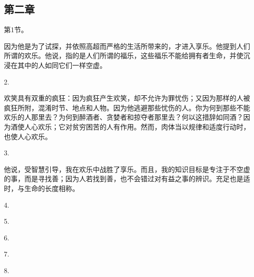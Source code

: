 
\subsection{第二章}

第1节。\par

因为他是为了试探，并依照高超而严格的生活所带来的，才进入享乐。他提到人们所谓的欢乐。他说，指的是人们所谓的福乐，这些福乐不能给拥有者生命，并使沉浸在其中的人如同它们一样空虚。\par

2. \par

欢笑具有双重的疯狂：因为疯狂产生欢笑，却不允许为罪忧伤；又因为那样的人被疯狂所附，混淆时节、地点和人物。因为他逃避那些忧伤的人。你为何到那些不能欢乐的人那里去？为何到醉酒者、贪婪者和掠夺者那里去？何以这措辞如同酒？因为酒使人心欢乐；它对贫穷困苦的人有作用。然而，肉体当以规律和适度行动时，也使人心欢乐。\par

3. \par

他说，受智慧引导，我在欢乐中战胜了享乐。而且，我的知识目标是专注于不空虚的事，而是寻找善；因为人若找到善，也不会错过对有益之事的辨识。充足也是适时，与生命的长度相称。\par

4. \par

5. \par

6. \par

7. \par

8. \par

